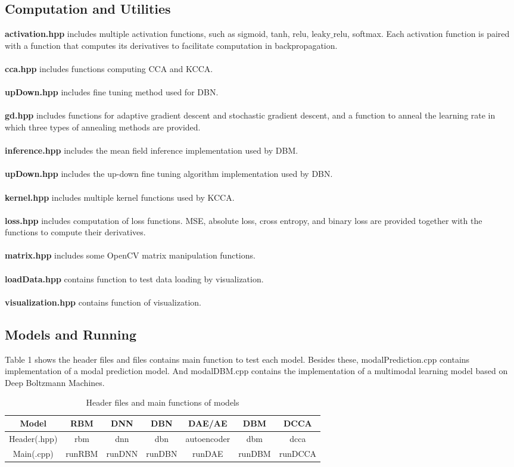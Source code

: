 \documentclass[12pt]{article}
\begin{document}
\subsection{Computation and Utilities}
\textbf{activation.hpp} includes multiple activation functions, such as sigmoid, tanh, relu, leaky$\_$relu, softmax. Each activation function is paired with a function that computes its derivatives to facilitate computation in backpropagation.\\
\\
\textbf{cca.hpp} includes functions computing CCA and KCCA.\\
\\
\textbf{upDown.hpp} includes fine tuning method used for DBN.\\
\\
\textbf{gd.hpp} includes functions for adaptive gradient descent and stochastic gradient descent, and a function to anneal the learning rate in which three types of annealing methods are provided.\\
\\
\textbf{inference.hpp} includes the mean field inference implementation used by DBM.\\
\\
\textbf{upDown.hpp} includes the up-down fine tuning algorithm implementation used by DBN.\\
\\
\textbf{kernel.hpp} includes multiple kernel functions used by KCCA.\\
\\
\textbf{loss.hpp} includes computation of loss functions. MSE, absolute loss, cross entropy, and binary loss are provided together with the functions to compute their derivatives.\\
\\
\textbf{matrix.hpp} includes some OpenCV matrix manipulation functions.\\
\\
\textbf{loadData.hpp} contains function to test data loading by visualization.\\
\\
\textbf{visualization.hpp} contains function of visualization.\\
\subsection{Models and Running}
Table 1 shows the header files and files contains main function to test each model. Besides these, modalPrediction.cpp contains implementation of a modal prediction model. And modalDBM.cpp contains the implementation of a multimodal learning model based on Deep Boltzmann Machines.
\begin{table}[h]
\centering
\begin{tabular}{|c|c|c|c|c|c|c|}
\hline
Model & RBM & DNN & DBN & DAE/AE & DBM & DCCA\\
\hline
Header(.hpp) & rbm &dnn & dbn & autoencoder & dbm & dcca\\
\hline
Main(.cpp) & runRBM & runDNN & runDBN & runDAE &runDBM & runDCCA \\
\hline
\end{tabular}
\caption{Header files and main functions of models}
\end{table}
\clearpage
\end{document}
